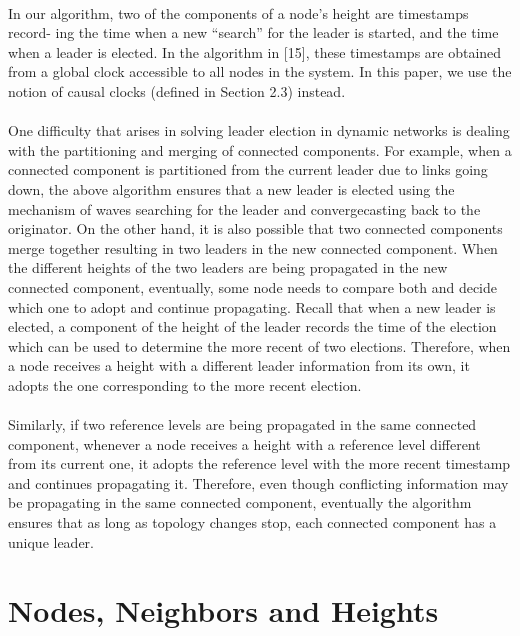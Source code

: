 \paragraph{}In our algorithm, two of the components of a node’s height are timestamps record- ing the time when a new “search” for the leader is started, and the time when a leader is elected. In the algorithm in [15], these timestamps are obtained from a global clock accessible to all nodes in the system. In this paper, we use the notion of causal clocks (defined in Section 2.3) instead.
\paragraph{}One difficulty that arises in solving leader election in dynamic networks is dealing with the partitioning and merging of connected components. For example, when a connected component is partitioned from the current leader due to links going down, the above algorithm ensures that a new leader is elected using the mechanism of waves searching for the leader and convergecasting back to the originator. On the other hand, it is also possible that two connected components merge together resulting in two leaders in the new connected component. When the different heights of the two leaders are being propagated in the new connected component, eventually, some node needs to compare both and decide which one to adopt and continue propagating. Recall that when a new leader is elected, a component of the height of the leader records the time of the election which can be used to determine the more recent of two elections. Therefore, when a node receives a height with a different leader information from its own, it adopts the one corresponding to the more recent election.
\paragraph{}Similarly, if two reference levels are being propagated in the same connected component, whenever a node receives a height with a reference level different from its current one, it adopts the reference level with the more recent timestamp and continues propagating it. Therefore, even though conflicting information may be propagating in the same connected component, eventually the algorithm ensures that as long as topology changes stop, each connected component has a unique leader.
\section{Nodes, Neighbors and Heights}
